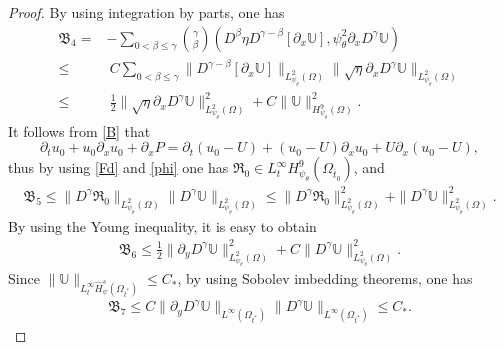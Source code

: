 \documentclass{amsart}
\numberwithin{equation}{section}
\begin{document}
\begin{proof}
By using integration by parts, one has
\begin{align*}
\mathfrak{B}_{4}
=&-\sum_{0<\beta\leq\gamma}\binom{\gamma}{\beta}
  (D^{\beta}\eta D^{\gamma-\beta}[\partial_{x}\mathbb{U}],\psi_{\theta}^{2}\partial_{x}D^{\gamma}\mathbb{U})\\
\leq&~C\sum_{0<\beta\leq\gamma}\|D^{\gamma-\beta}[\partial_{x}\mathbb{U}]\|_{L_{\psi_{\theta}}^{2}(\Omega)}
       \|\sqrt{\eta}\partial_{x}D^{\gamma}\mathbb{U}\|_{L_{\psi_{\theta}}^{2}(\Omega)}\\
\leq&~\frac{1}{2}\|\sqrt{\eta}\partial_{x}D^{\gamma}\mathbb{U}\|_{L_{\psi_{\theta}}^{2}(\Omega)}^{2}
     +C\|\mathbb{U}\|_{H_{\psi_{\theta}}^{9}(\Omega)}^{2}.
\end{align*}
It follows from \eqref{B} that
$$\partial_{t}u_{0}+u_{0}\partial_{x}u_{0}+\partial_{x}P=\partial_{t}(u_{0}-U)+(u_{0}-U)\partial_{x}u_{0}+U\partial_{x}(u_{0}-U),$$
thus by using \eqref{Fd} and \eqref{phi} one has $\mathfrak{R}_{0}\in L_{t}^{\infty}H_{\psi_{\theta}}^{9}(\Omega_{\bar{t}_{0}})$, and
\begin{align*}
\mathfrak{B}_{5}
\leq \|D^{\gamma}\mathfrak{R}_{0}\|_{L_{\psi_{\theta}}^{2}(\Omega)}\|D^{\gamma}\mathbb{U}\|_{L_{\psi_{\theta}}^{2}(\Omega)}
\leq \|D^{\gamma}\mathfrak{R}_{0}\|_{L_{\psi_{\theta}}^{2}(\Omega)}^{2}+\|D^{\gamma}\mathbb{U}\|_{L_{\psi_{\theta}}^{2}(\Omega)}^{2}.
\end{align*}
By using the Young inequality, it is easy to obtain
\begin{align*}
\mathfrak{B}_{6}
\leq \frac{1}{2}\|\partial_{y}D^{\gamma}\mathbb{U}\|_{L_{\psi_{\theta}}^{2}(\Omega)}^{2}
    +C\|D^{\gamma}\mathbb{U}\|_{L_{\psi_{\theta}}^{2}(\Omega)}^{2}.
\end{align*}
Since $\|\mathbb{U}\|_{L_{t}^{\infty}\hat{H}_{\psi}^{s}(\Omega_{t^{*}})}\leq C_{*}$, by using Sobolev imbedding theorems, one has
\begin{align*}
\mathfrak{B}_{7}
\leq C\|\partial_{y}D^{\gamma}\mathbb{U}\|_{L^{\infty}(\Omega_{t^{*}})}\|D^{\gamma}\mathbb{U}\|_{L^{\infty}(\Omega_{t^{*}})}
\leq C_{*}.
\end{align*}


\end{proof}
\end{document}
